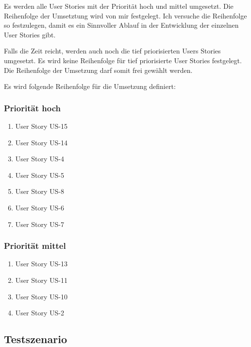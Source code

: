 \documentclass[listof=totocnumbered, bibliography=totocnumbered]{scrreprt}
\begin{document}
  Es werden alle User Stories mit der Priorität hoch und mittel umgesetzt. Die
  Reihenfolge der Umsetztung wird von mir festgelegt. Ich versuche die
  Reihenfolge so festzulegen, damit es ein Sinnvoller Ablauf in der Entwicklung
  der einzelnen User Stories gibt.
  
  Falls die Zeit reicht, werden auch noch die tief priorisierten Users Stories
  umgesetzt. Es wird keine Reihenfolge für tief priorisierte User Stories
  festgelegt. Die Reihenfolge der Umsetzung darf somit frei gewählt werden.\newline
  
  Es wird folgende Reihenfolge für die Umsetzung definiert:

  \subsubsection{Priorität hoch}
  
  
  \begin{enumerate}
    \item User Story US-15
    \item User Story US-14
    \item User Story US-4
    \item User Story US-5
    \item User Story US-8
    \item User Story US-6
    \item User Story US-7
    \setcounter{userStoriesZaehler}{\value{enumi}}
  \end{enumerate}
  
  \subsubsection{Priorität mittel}
  
  \begin{enumerate}
    \setcounter{enumi}{\value{userStoriesZaehler}}
    \item User Story US-13
    \item User Story US-11
    \item User Story US-10
    \item User Story US-2
  \end{enumerate}
  
  \subsection{Testszenario}
  
\end{document}
